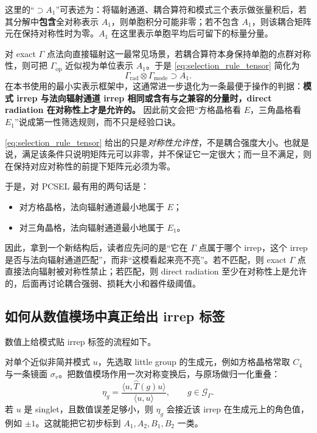 这里的“$\supset A_1$”可表述为：将辐射通道、耦合算符和模式三个表示做张量积后，若其分解中\textbf{包含}全对称表示 $A_1$，则单胞积分可能非零；若不包含 $A_1$，则该耦合矩阵元在保持对称性时为零。$A_1$ 在这里表示单胞平均后可留下的标量分量。

对 exact $\Gamma$ 点法向直接辐射这一最常见场景，若耦合算符本身保持单胞的点群对称性，则可把 $\Gamma_{\mathrm{op}}$ 近似视为单位表示 $A_1$。于是 \cref{eq:selection_rule_tensor} 简化为
\begin{equation}
\Gamma_{\mathrm{rad}}\otimes \Gamma_{\mathrm{mode}}
\supset
A_1.
\label{eq:selection_rule_simple}
\end{equation}
在本书使用的最小实表示框架中，这通常进一步退化为一条最便于操作的判据：\textbf{模式 irrep 与法向辐射通道 irrep 相同或含有与之兼容的分量时，direct radiation 在对称性上才是允许的。} 因此前文会把“方格晶格看 $E$，三角晶格看 $E_1$”说成第一性筛选规则，而不只是经验口诀\cite{sakoda2005,hsu2016}。

\cref{eq:selection_rule_tensor} 给出的只是\emph{对称性允许性}，不是耦合强度大小。也就是说，满足该条件只说明矩阵元可以非零，并不保证它一定很大；而一旦不满足，则在保持对应对称性的前提下矩阵元必须为零。

于是，对 PCSEL 最有用的两句话是：
\begin{itemize}
  \item 对方格晶格，法向辐射通道最小地属于 $E$；
  \item 对三角晶格，法向辐射通道最小地属于 $E_1$。
\end{itemize}
因此，拿到一个新结构后，读者应先问的是“它在 $\Gamma$ 点属于哪个 irrep，这个 irrep 是否与法向辐射通道匹配”，而非“这模看起来亮不亮”。若不匹配，则 exact $\Gamma$ 点直接法向辐射被对称性禁止；若匹配，则 direct radiation 至少在对称性上是允许的，后面再讨论耦合强弱、损耗大小和器件级阈值。

\subsection{如何从数值模场中真正给出 irrep 标签}
数值上给模式贴 irrep 标签的流程如下。

对单个近似非简并模式 $u$，先选取 little group 的生成元，例如方格晶格常取 $C_4$ 与一条镜面 $\sigma_v$。把数值模场作用一次对称变换后，与原场做归一化重叠：
\begin{equation}
\eta_g
=
\frac{\langle u,\hat T(g)u\rangle}{\langle u,u\rangle},
\qquad
g\in \mathcal{G}_\Gamma.
\label{eq:irrep_projection_singlet}
\end{equation}
若 $u$ 是 singlet，且数值误差足够小，则 $\eta_g$ 会接近该 irrep 在生成元上的角色值，例如 $\pm1$。这就能把它初步标到 $A_1,A_2,B_1,B_2$ 一类。

